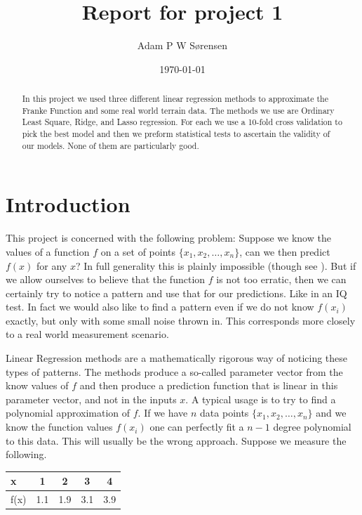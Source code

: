 \documentclass[parskip=half]{scrartcl}
\title{Report for project 1}
\date{\today}
\author{Adam P W S{\o}rensen}
\theoremstyle{definition}
\theoremstyle{remark}
\begin{document}

\maketitle

\begin{abstract}
In this project we used three different linear regression methods to approximate the Franke Function and some real world terrain data. 
The methods we use are Ordinary Least Square, Ridge, and Lasso regression. 
For each we use a 10-fold cross validation to pick the best model and then we preform statistical tests to ascertain the validity of our models. 
None of them are particularly good. 
\end{abstract}


\section{Introduction}

This project is concerned with the following problem: Suppose we know the values of a function $f$ on a set of points $\{x_1, x_2, \ldots, x_n\}$, can we then predict $f(x)$ for any $x$?
In full generality this is plainly impossible (though see \cite{ht:choice}).
But if we allow ourselves to believe that the function $f$ is not too erratic, then we can certainly try to notice a pattern and use that for our predictions.
Like in an IQ test.
In fact we would also like to find a pattern even if we do not know $f(x_i)$ exactly, but only with some small noise thrown in.
This corresponds more closely to a real world measurement scenario. 

Linear Regression methods are a mathematically rigorous way of noticing these types of patterns.
The methods produce a so-called parameter vector from the know values of $f$ and then produce a prediction function that is linear in this parameter vector, and not in the inputs $x$. 
A typical usage is to try to find a polynomial approximation of $f$. 
If we have $n$ data points $\{x_1, x_2, \ldots, x_n\}$ and we know the function values $f(x_i)$ one can perfectly fit a $n-1$ degree polynomial to this data.
This will usually be the wrong approach. 
Suppose we measure the following. 

\begin{center}
\begin{tabular}{l|cccc}
x & 1 & 2 & 3 & 4\\
\hline
f(x) & 1.1 & 1.9 & 3.1 & 3.9
\end{tabular} 
\end{center} 
\end{document}
